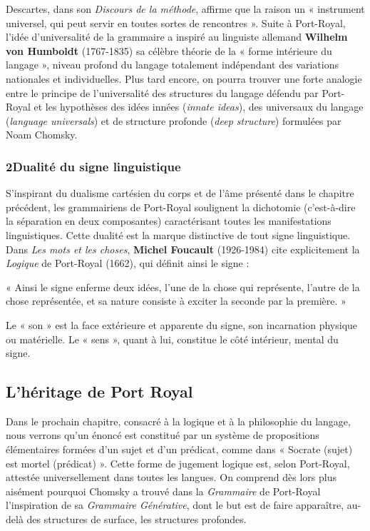 Descartes, dans son \textit{Discours de la méthode}, affirme que la raison un « instrument universel, qui peut servir en toutes sortes de rencontres ». Suite à Port-Royal, l’idée d’universalité de la grammaire a inspiré au linguiste allemand \textbf{Wilhelm von Humboldt} (1767-1835) sa célèbre théorie de la « forme intérieure du langage », niveau profond du langage totalement indépendant des variations nationales et individuelles. Plus tard encore, on pourra trouver une forte analogie entre le principe de l’universalité des structures du langage défendu par Port-Royal et les hypothèses des idées innées (\textit{innate ideas}), des universaux du langage (\textit{language universals}) et de structure profonde (\textit{deep structure}) formulées par Noam Chomsky.
\subsubsection*{2\quad Dualité du signe linguistique}
S’inspirant du dualisme cartésien du corps et de l’âme présenté dans le chapitre précédent, les grammairiens de Port-Royal soulignent la dichotomie (c’est-à-dire la séparation en deux composantes) caractérisant toutes les manifestations linguistiques. Cette dualité est la marque distinctive de tout signe linguistique. Dans \textit{Les mots et les choses}, \textbf{Michel Foucault} (1926-1984) cite explicitement la \textit{Logique} de Port-Royal (1662), qui définit ainsi le signe :
\begin{lecture}{}
« Ainsi le signe enferme deux idées, l’une de la chose qui représente, l’autre de la chose représentée, et sa nature consiste à exciter la seconde par la première. »

Le « son » est la face extérieure et apparente du signe, son incarnation physique ou matérielle. Le « sens », quant à lui, constitue le côté intérieur, mental du signe.
\end{lecture}
\subsection{L’héritage de Port Royal}
Dans le prochain chapitre, consacré à la logique et à la philosophie du langage, nous verrons qu’un énoncé est constitué par un système de propositions élémentaires formées d’un sujet et d’un prédicat, comme dans « Socrate (sujet) est mortel (prédicat) ». Cette forme de jugement logique est, selon Port-Royal, attestée universellement dans toutes les langues. On comprend dès lors plus aisément pourquoi Chomsky a trouvé dans la \textit{Grammaire} de Port-Royal l’inspiration de sa \textit{Grammaire Générative}, dont le but est de faire apparaître, au-delà des structures de surface, les structures profondes.
